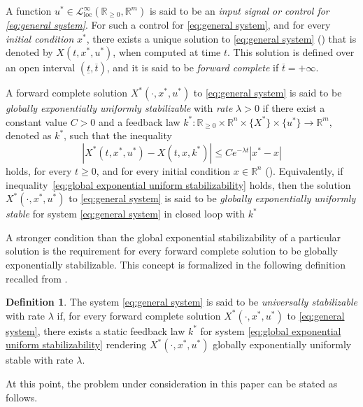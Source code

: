 \documentclass[10pt,twocolumn,twoside]{IEEEtran}
\theoremstyle{plain}
\theoremstyle{definition}
\newtheorem{definition}{Definition}
\theoremstyle{remark}
\begin{document}
A function $u^\ast\in\mathcal{L}_{\mathrm{loc}}^\infty(\mathbb{R}_{\geq0},\mathbb{R}^m)$ is said to be an \emph{input signal or control for \eqref{eq:general system}}. For such a control for \eqref{eq:general system}, and for every \emph{initial condition} $x^\ast$, there exists a unique solution to \eqref{eq:general system} (\cite{Teschl2012}) that is denoted by $X(t,x^\ast,u^\ast)$, when computed at time $t$. This solution is defined over an open interval $(\underline{t},\overline{t})$, and it is said to be \emph{forward complete} if $\overline{t}=+\infty$.

A forward complete solution $X^\ast(\cdot,x^\ast,u^\ast)$ to \eqref{eq:general system} is said to be  \emph{globally exponentially uniformly stabilizable} with \emph{rate} $\lambda>0$ if there exist a constant value $C>0$ and a feedback law $k^\ast:\mathbb{R}_{\geq0}\times\mathbb{R}^n\times\{X^\ast\}\times\{u^\ast\}\to\mathbb{R}^m$, denoted as $k^\ast$, such that the inequality
\begin{equation}\label{eq:global exponential uniform stabilizability}
	\left|X^\ast(t,x^\ast,u^\ast)-X(t,x,k^\ast)\right|\leq Ce^{-\lambda t}|x^\ast-x|
\end{equation}
holds, for every $t\geq0$, and for every initial condition $x\in\mathbb{R}^n$ (\cite{Manchester2014a}). Equivalently, if inequality~\eqref{eq:global exponential uniform stabilizability} holds, then the solution $X^\ast(\cdot,x^\ast,u^\ast)$ to \eqref{eq:general system} is said to be \emph{globally exponentially uniformly stable} for system \eqref{eq:general system} in closed loop with $k^\ast$

A stronger condition than the global exponential stabilizability of a particular solution is the requirement for every forward complete solution to be globally exponentially stabilizable. This concept is formalized in the following definition recalled from \cite{Manchester2014a}.

\begin{definition}\label{def:US}
	The system \eqref{eq:general system} is said to be \emph{universally stabilizable} with rate $\lambda$ if, for every forward complete solution $X^\ast(\cdot,x^\ast,u^\ast)$ to \eqref{eq:general system}, there exists a static feedback law $k^\ast$ for system \eqref{eq:global exponential uniform stabilizability} rendering $X^\ast(\cdot,x^\ast,u^\ast)$ globally exponentially uniformly stable with rate $\lambda$.
\end{definition}

At this point, the problem under consideration in this paper can be stated as follows.
\end{document}
